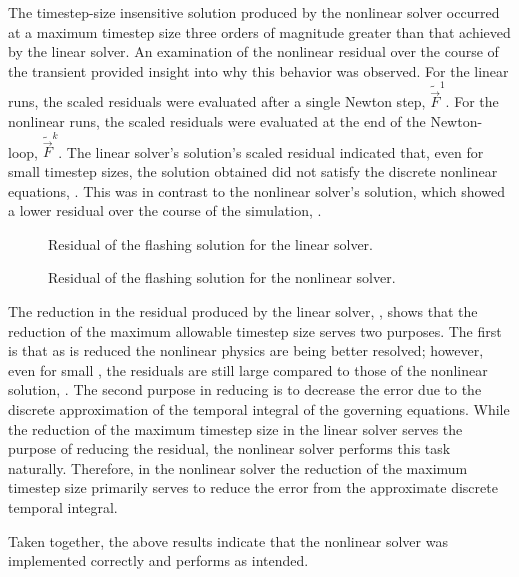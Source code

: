 The timestep-size insensitive solution produced by the nonlinear solver occurred at a maximum timestep size three orders of magnitude greater than that achieved by the linear solver.
An examination of the nonlinear residual over the course of the transient provided insight into why this behavior was observed.
For the linear runs, the scaled residuals were evaluated after a single Newton step, $\tilde{\vec{F}}^{1}$.
For the nonlinear runs, the scaled residuals were evaluated at the end of the Newton-loop, $\tilde{\vec{F}}^{k}$.
The linear solver's solution's scaled residual indicated that, even for small timestep sizes, the solution obtained did not satisfy the discrete nonlinear equations, .
This was in contrast to the nonlinear solver's solution, which showed a lower residual over the course of the simulation, .

\begin{figure}[h!tb]
\centering

\caption{Residual of the flashing solution for the linear solver.}
\label{fig:flashingResidualLin}
\end{figure}

\begin{figure}[h!tb]
\centering

\caption{Residual of the flashing solution for the nonlinear solver.}
\label{fig:flashingResidualNln}
\end{figure}

The reduction in the residual produced by the linear solver, , shows that the reduction of the maximum allowable timestep size serves two purposes.
The first is that as \dtmax{} is reduced the nonlinear physics are being better resolved; however, even for small \dtmax{}, the residuals are still large compared to those of the nonlinear solution, .
The second purpose in reducing \dtmax{} is to decrease the error due to the discrete approximation of the temporal integral of the governing equations.
While the reduction of the maximum timestep size in the linear solver serves the purpose of reducing the residual, the nonlinear solver performs this task naturally.
Therefore, in the nonlinear solver the reduction of the maximum timestep size primarily serves to reduce the error from the approximate discrete temporal integral.

Taken together, the above results indicate that the nonlinear solver was implemented correctly and performs as intended.

